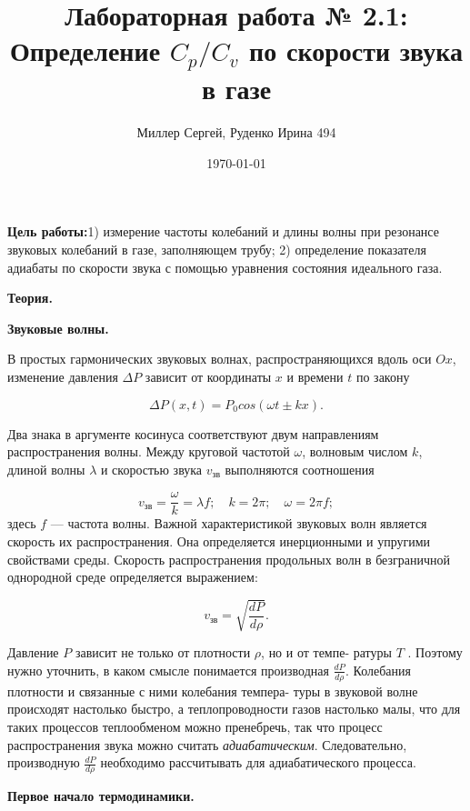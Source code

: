\documentclass[12pt]{article}
\title{Лабораторная работа № 2.1:
    Определение $C_p/C_v$ по скорости звука в газе    
}
\date{\today}
\author{Миллер Сергей, Руденко Ирина 494}
\begin{document}
    \maketitle
    \textbf{Цель работы:}1)  измерение частоты колебаний и длины волны при резонансе звуковых колебаний в газе, заполняющем трубу; 2) определение показателя адиабаты по скорости звука с помощью уравнения состояния идеального газа.

    \textbf{Теория.}

    \textbf{Звуковые волны.} 

    В простых гармонических звуковых волнах, распространяющихся вдоль оси $Ox$, изменение давления $\Delta P$ зависит от координаты $x$ и времени $t$ по закону

    \begin{equation}
        \Delta P(x,t) = P_0 cos(\omega t \pm kx).
    \end{equation}

    Два знака в аргументе косинуса соответствуют двум направлениям распространения волны. Между круговой частотой $\omega$, волновым числом $k$, длиной волны $\lambda$ и скоростью звука $v_\text{зв}$ выполняются соотношения

    \begin{equation}
        v_\text{зв} = \frac{\omega}{k} = \lambda f; \quad k = 2\pi; \quad \omega = 2\pi f;
    \end{equation}
    здесь $f$ — частота волны.
    Важной характеристикой звуковых волн является скорость их
    распространения. Она определяется инерционными и упругими свойствами среды. Скорость распространения продольных волн в безграничной однородной среде определяется выражением:
     
    \begin{equation}
        v_\text{зв} = \sqrt{\frac{dP}{d\rho}}.
    \end{equation}

    Давление $P$ зависит не только от плотности $\rho$, но и от темпе- ратуры $T$ . Поэтому нужно уточнить, в каком смысле понимается производная $\frac{dP}{d\rho}$.
    Колебания плотности и связанные с ними колебания темпера- туры в звуковой волне происходят настолько быстро, а теплопроводности газов настолько малы, что для таких процессов теплообменом можно пренебречь, так что процесс распространения звука можно считать \textit{адиабатическим}. Следовательно, производную $\frac{dP}{d\rho}$ необходимо рассчитывать для адиабатического процесса.


    \textbf{ Первое начало термодинамики.}
\end{document}
